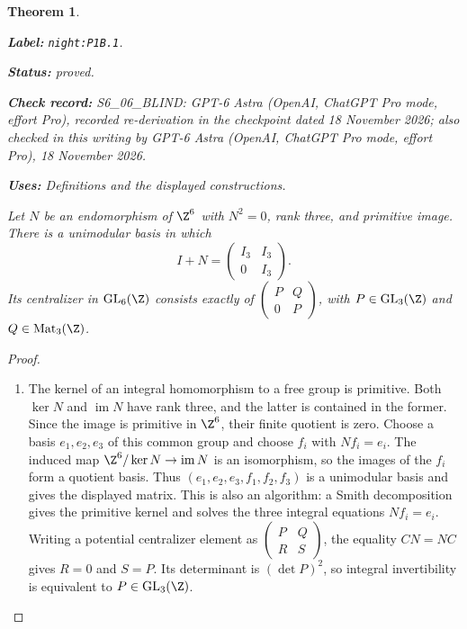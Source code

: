 \documentclass[11pt,a4paper]{article}
\newtheorem{theorem}{Theorem}[section]
\theoremstyle{definition}
\newcommand{\StatementRecord}[4]{\par\smallskip\begingroup\upshape\raggedright\noindent\textbf{Label:} \nolinkurl{#1}.\par\noindent\textbf{Status:} #2.\par\noindent\textbf{Check record:} #3.\par\noindent\textbf{Uses:} #4.\par\endgroup\smallskip}
\newcommand{\CurrentChecker}{GPT-6 Astra (OpenAI, ChatGPT Pro mode, effort Pro), 18 November 2026}
\begin{document}
\begin{theorem}\label{night:P1B.1}
\StatementRecord{night:P1B.1}{proved}{S6\_06\_BLIND: GPT-6 Astra (OpenAI, ChatGPT Pro mode, effort Pro), recorded re-derivation in the checkpoint dated 18 November 2026; also checked in this writing by \CurrentChecker}{Definitions and the displayed constructions}
Let $N$ be an endomorphism of $\Z^6$ with $N^2=0$, rank three,
and primitive image. There is a unimodular basis in which
\[
 I+N=\begin{pmatrix}I_3&I_3\\0&I_3\end{pmatrix}.
\]
Its centralizer in $\operatorname{GL}_6(\Z)$ consists exactly of
$\left(\begin{smallmatrix}P&Q\\0&P\end{smallmatrix}\right)$,
with $P\in\operatorname{GL}_3(\Z)$ and $Q\in\operatorname{Mat}_3(\Z)$.
\end{theorem}
\begin{proof}
\begin{enumerate}[label=\arabic*.]
\item The kernel of an integral homomorphism to a free group is
primitive. Both $\ker N$ and $\operatorname{im}N$ have rank three,
and the latter is contained in the former. Since the image is
primitive in $\Z^6$, their finite quotient is zero. Choose a basis
$e_1,e_2,e_3$ of this common group and choose $f_i$ with $Nf_i=e_i$.
The induced map $\Z^6/\ker N\to\operatorname{im}N$ is an
isomorphism, so the images of the $f_i$ form a quotient basis.
Thus $(e_1,e_2,e_3,f_1,f_2,f_3)$ is a unimodular basis and gives
the displayed matrix. This is also an algorithm: a Smith
decomposition gives the primitive kernel and solves the three
integral equations $Nf_i=e_i$.
Writing a potential centralizer element as
$\left(\begin{smallmatrix}P&Q\\R&S\end{smallmatrix}\right)$,
the equality $CN=NC$ gives $R=0$ and $S=P$.
Its determinant is $(\det P)^2$, so integral invertibility
is equivalent to $P\in\operatorname{GL}_3(\Z)$.

\end{enumerate}
\end{proof}
\end{document}
